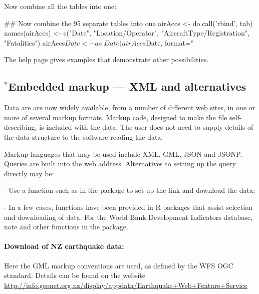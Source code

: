 Now combine all the tables into one:
\begin{fullwidth}

\begin{Schunk}
\begin{Sinput}
## Now combine the 95 separate tables into one
airAccs <- do.call('rbind', tab)
names(airAccs) <- c("Date", "Location/Operator",
                     "AircraftType/Registration", "Fatalities")
airAccs$Date <- as.Date(airAccs$Date, format="%d %b %Y")
\end{Sinput}
\end{Schunk}

\end{fullwidth}

The help page  gives examples that
  demonstrate other possibilities.

\subsection{$^*$Embedded markup --- XML and alternatives}\label{ss:markup}

Data are are now widely available, from a number of different web
sites, in one or more of several markup formats.  Markup code,
designed to make the file self-describing, is included with the data.
The user does not need to supply details of the data structure to the
software reading the data.

Markup languages that may be used include XML, GML, JSON and JSONP.
Queries are built into the web address.
Alternatives to setting up the query directly may be:
\begin{itemizz}
  \item[-] Use a function such as  in the 
    package to set up the link and download the data;
  \item[-] In a few cases, functions have been provided in R packages
    that assist selection and downloading of data.
    For the World Bank Development Indicators database, note 
    and other functions in the  package.
\end{itemizz}

\paragraph{Download of NZ earthquake data:}
Here the GML markup conventions are used, as defined by
the WFS OGC standard.
Details can be found on the website
  \url{http://info.geonet.org.nz/display/appdata/Earthquake+Web+Feature+Service}

